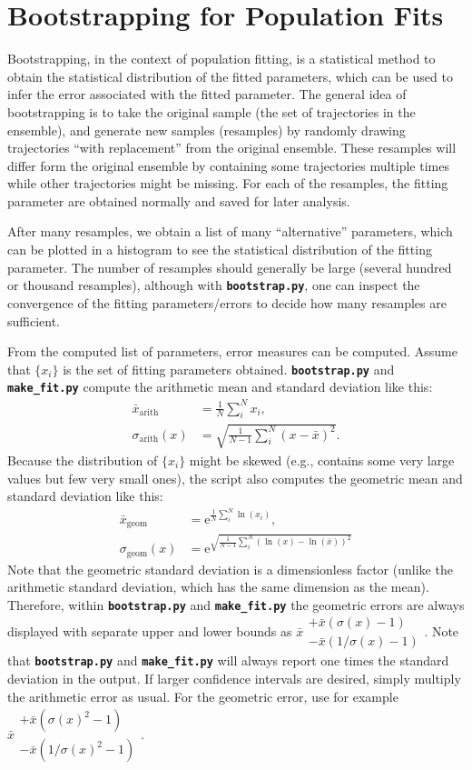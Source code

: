 \documentclass[a4paper,10pt,DIV=15,openany]{scrbook}
\newcommand{\ttt}[1]{\textbf{\texttt{#1}}}
\newcommand{\E}{\ensuremath{\mathrm{e}}}
\begin{document}
\section{Bootstrapping for Population Fits}\label{met:bootstrapping}

Bootstrapping, in the context of population fitting, is a statistical method to obtain the statistical distribution of the fitted parameters, which can be used to infer the error associated with the fitted parameter.
The general idea of bootstrapping is to take the original sample (the set of trajectories in the ensemble), and generate new samples (resamples) by randomly drawing trajectories ``with replacement'' from the original ensemble.
These resamples will differ form the original ensemble by containing some trajectories multiple times while other trajectories might be missing.
For each of the resamples, the fitting parameter are obtained normally and saved for later analysis.

After many resamples, we obtain a list of many ``alternative'' parameters, which can be plotted in a histogram to see the statistical distribution of the fitting parameter.
The number of resamples should generally be large (several hundred or thousand resamples), although with \ttt{bootstrap.py}, one can inspect the convergence of the fitting parameters/errors to decide how many resamples are sufficient.

From the computed list of parameters, error measures can be computed.
Assume that $\{x_i\}$ is the set of fitting parameters obtained.
\ttt{bootstrap.py} and \ttt{make\_fit.py} compute the arithmetic mean and standard deviation like this:
\begin{align}
  \bar{x}_\text{arith}&=\frac{1}{N}\sum_i^Nx_i,\\
  \sigma_\text{arith}(x)&=\sqrt{\frac{1}{N-1}\sum_i^N(x-\bar{x})^2}.
\end{align}
Because the distribution of $\{x_i\}$ might be skewed (e.g., contains some very large values but few very small ones), the script also computes the geometric mean and standard deviation like this:
\begin{align}
  \bar{x}_\text{geom}&=\E^{\frac{1}{N}\sum_i^N\ln(x_i)},\\
  \sigma_\text{geom}(x)&=\E^{\sqrt{\frac{1}{N-1}\sum_i^N(\ln(x)-\ln(\bar{x}))^2}}
\end{align}
Note that the geometric standard deviation is a dimensionless factor (unlike the arithmetic standard deviation, which has the same dimension as the mean).
Therefore, within \ttt{bootstrap.py} and \ttt{make\_fit.py} the geometric errors are always displayed with separate upper and lower bounds as $\bar{x}\substack{+\bar{x}(\sigma(x)-1) \\ -\bar{x}(1/\sigma(x)-1)}$. 
Note that \ttt{bootstrap.py} and \ttt{make\_fit.py} will always report one times the standard deviation in the output.
If larger confidence intervals are desired, simply multiply the arithmetic error as usual.
For the geometric error, use for example $\bar{x}\substack{+\bar{x}(\sigma(x)^2-1) \\ -\bar{x}(1/\sigma(x)^2-1)}$.
\end{document}
